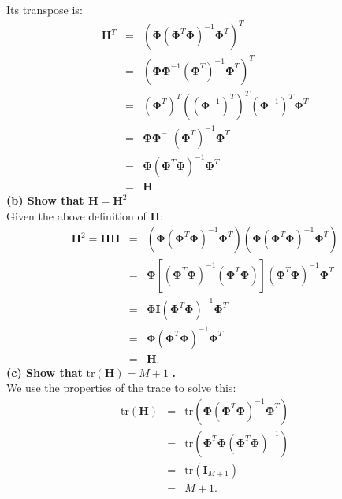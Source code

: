 \documentclass[a4paper, 11pt]{article}
\begin{document}
Its transpose is:
\begin{eqnarray}
\mathbf{H}^T &=& \left( \mathbf{\Phi} \left( \mathbf{\Phi}^T \mathbf{\Phi} \right)^{-1} \mathbf{\Phi}^T \right)^T \nonumber \\
&=& \left( \mathbf{\Phi} \mathbf{\Phi}^{-1} \left( \mathbf{\Phi}^T\right)^{-1}  \mathbf{\Phi}^T \right)^T \nonumber \\
&=& \left( \mathbf{\Phi}^T \right)^T \left( \left( \mathbf{\Phi}^{-1} \right)^T \right)^T \left( \mathbf{\Phi}^{-1} \right)^T \mathbf{\Phi}^T \nonumber \\
&=&\mathbf{\Phi} \mathbf{\Phi}^{-1} \left( \mathbf{\Phi}^T \right)^{-1} \mathbf{\Phi}^T \nonumber \\
&=& \mathbf{\Phi} \left( \mathbf{\Phi}^T \mathbf{\Phi} \right)^{-1} \mathbf{\Phi}^T \nonumber \\
&=& \mathbf{H}. \nonumber
\end{eqnarray}
\textbf{(b) Show that $\mathbf{H} = \mathbf{H}^2$}\\
\newline Given the above definition of $\mathbf{H}$:
\begin{eqnarray}
\mathbf{H}^2 = \mathbf{H} \mathbf{H} &=& \left( \mathbf{\Phi} \left( \mathbf{\Phi}^T \mathbf{\Phi} \right)^{-1} \mathbf{\Phi}^T \right) \left( \mathbf{\Phi} \left( \mathbf{\Phi}^T \mathbf{\Phi} \right)^{-1} \mathbf{\Phi}^T \right) \nonumber \\
&=& \mathbf{\Phi} \left[ \left( \mathbf{\Phi}^T \mathbf{\Phi} \right)^{-1} \left( \mathbf{\Phi}^T \mathbf{\Phi} \right) \right] \left( \mathbf{\Phi}^T \mathbf{\Phi} \right)^{-1} \mathbf{\Phi}^T \nonumber \\
&=& \mathbf{\Phi} \mathbf{I} \left( \mathbf{\Phi}^T \mathbf{\Phi} \right)^{-1} \mathbf{\Phi}^T \nonumber \\
&=& \mathbf{\Phi} \left( \mathbf{\Phi}^T \mathbf{\Phi} \right)^{-1} \mathbf{\Phi}^T \nonumber \\
&=& \mathbf{H}.  \nonumber
\end{eqnarray}
\textbf{(c) Show that} $\text{tr}(\mathbf{H}) = M+1$ \textbf{.}\\
\newline We use the properties of the trace to solve this:
\begin{eqnarray}
\text{tr}(\mathbf{H}) &=& \text{tr} \left( \mathbf{\Phi} \left( \mathbf{\Phi}^T \mathbf{\Phi} \right)^{-1} \mathbf{\Phi}^T \right) \nonumber \\
&=& \text{tr} \left( \mathbf{\Phi}^T \mathbf{\Phi} \left( \mathbf{\Phi}^T \mathbf{\Phi} \right)^{-1} \right) \nonumber \\
&=& \text{tr} \left(\mathbf{I}_{M+1} \right) \nonumber \\
&=& M+1. \nonumber
\end{eqnarray}
\end{document}
